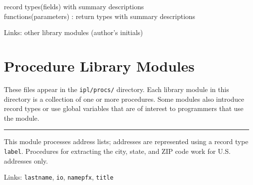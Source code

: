record types(fields) with summary descriptions\\
functions(parameters) : return types with summary descriptions

Links: other library modules (author's initials)

\section{Procedure Library Modules}

These files appear in the \texttt{ipl/procs/} directory. Each library
module in this directory is a collection of one or more procedures.
Some modules also introduce record types or use global variables that
are of interest to programmers that use the module.

\vspace{0.25cm}\hrule{}

This module processes address lists; addresses are
represented using a record type \texttt{label}. Procedures for
extracting the city, state, and ZIP code work for U.S. addresses only.


Links: \texttt{lastname}, \texttt{io}, \texttt{namepfx}, \texttt{title}

